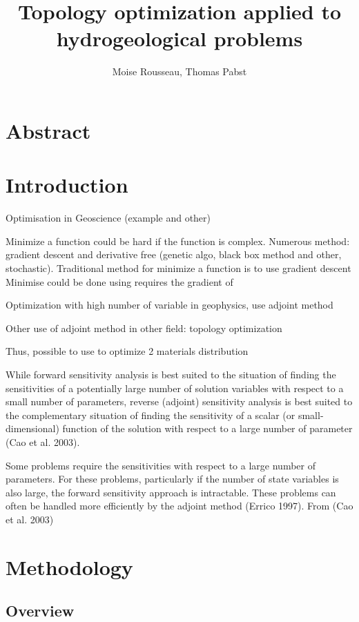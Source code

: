 \documentclass[11pt]{article}
\title{\textbf{Topology optimization applied to hydrogeological problems}}
\author{Moise Rousseau, Thomas Pabst}
\date{}
\begin{document}
\maketitle
\thispagestyle{empty}

\section*{Abstract}



\section{Introduction}

Optimisation in Geoscience (example and other)

Minimize a function could be hard if the function is complex. Numerous method: gradient descent and derivative free (genetic algo, black box method and other, stochastic).
Traditional method for minimize a function is to use gradient descent
Minimise could be done using requires the gradient of 

Optimization with high number of variable in geophysics, use adjoint method

Other use of adjoint method in other field: topology optimization 

Thus, possible to use to optimize 2 materials distribution

While forward sensitivity analysis is best suited to the situation of finding the sensitivities of a potentially large number of solution variables with respect to a small number of parameters, reverse (adjoint) sensitivity analysis is best suited to the complementary situation of finding the sensitivity of a scalar (or small-dimensional) function of the solution with respect to a large number of parameter (Cao et al. 2003).

Some problems require the sensitivities with respect to a large number of parameters. For these problems, particularly if the number of state variables is also large, the forward sensitivity approach is intractable. These problems can often be handled more efficiently by the adjoint method (Errico 1997). From (Cao et al. 2003) 




\section{Methodology}

\subsection{Overview}
\end{document}
